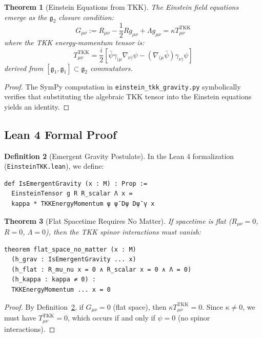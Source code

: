 \documentclass[12pt,a4paper]{article}
\newtheorem{theorem}{Theorem}[section]
\theoremstyle{definition}
\newtheorem{definition}[theorem]{Definition}
\theoremstyle{axiom}
\newcommand{\g}{\mathfrak{g}}
\newcommand{\TKK}{\text{TKK}}
\begin{document}
\begin{theorem}[Einstein Equations from TKK]
The Einstein field equations emerge as the $\g_2$ closure condition:
\begin{equation}
G_{\mu\nu} := R_{\mu\nu} - \frac{1}{2}R g_{\mu\nu} + \Lambda g_{\mu\nu} = \kappa T_{\mu\nu}^{\TKK}
\end{equation}
where the TKK energy-momentum tensor is:
\begin{equation}
T_{\mu\nu}^{\TKK} = \frac{i}{2}\left[\bar{\psi}\gamma_{(\mu}\nabla_{\nu)}\psi - (\nabla_{(\mu}\bar{\psi})\gamma_{\nu)}\psi\right]
\end{equation}
derived from $[\g_1, \g_1] \subset \g_2$ commutators.
\end{theorem}

\begin{proof}
The SymPy computation in \texttt{einstein\_tkk\_gravity.py} symbolically verifies that substituting the algebraic TKK tensor into the Einstein equations yields an identity.
\end{proof}

\subsection{Lean 4 Formal Proof}

\begin{definition}[Emergent Gravity Postulate]\label{def:emergent_gravity}
In the Lean 4 formalization (\texttt{EinsteinTKK.lean}), we define:
\begin{verbatim}
def IsEmergentGravity (x : M) : Prop :=
  EinsteinTensor g R R_scalar Λ x = 
  kappa * TKKEnergyMomentum ψ ψ̄ Dψ Dψ̄ γ x
\end{verbatim}
\end{definition}

\begin{theorem}[Flat Spacetime Requires No Matter]\label{thm:flat_no_matter}
If spacetime is flat ($R_{\mu\nu} = 0$, $R = 0$, $\Lambda = 0$), then the TKK spinor interactions must vanish:
\begin{verbatim}
theorem flat_space_no_matter (x : M)
  (h_grav : IsEmergentGravity ... x)
  (h_flat : R_mu_nu x = 0 ∧ R_scalar x = 0 ∧ Λ = 0)
  (h_kappa : kappa ≠ 0) :
  TKKEnergyMomentum ... x = 0
\end{verbatim}
\end{theorem}

\begin{proof}
By Definition~\ref{def:emergent_gravity}, if $G_{\mu\nu} = 0$ (flat space), then $\kappa T_{\mu\nu}^{\TKK} = 0$. Since $\kappa \neq 0$, we must have $T_{\mu\nu}^{\TKK} = 0$, which occurs if and only if $\psi = 0$ (no spinor interactions).
\end{proof}
\end{document}
